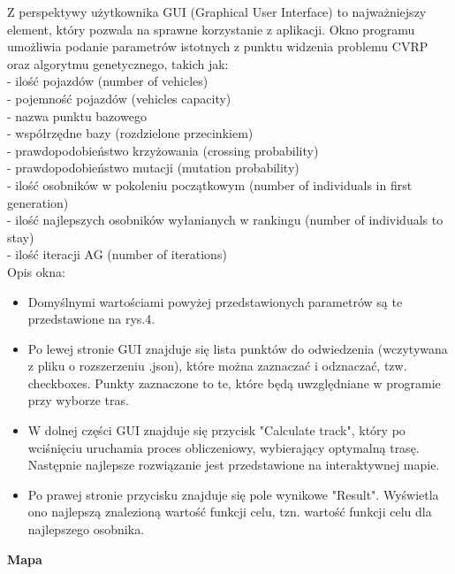 \documentclass[a4paper, twoside, 12pt, justified]{article}
\begin{document}
	Z perspektywy użytkownika GUI (Graphical User Interface) to najważniejszy element, który pozwala na sprawne korzystanie z aplikacji. Okno programu umożliwia podanie parametrów istotnych z punktu widzenia problemu CVRP oraz algorytmu genetycznego, takich jak: \\
	- ilość pojazdów (number of vehicles)\\
	- pojemność pojazdów (vehicles capacity)\\
	- nazwa punktu bazowego\\
	- współrzędne bazy (rozdzielone przecinkiem)\\
	- prawdopodobieństwo krzyżowania (crossing probability)\\
	- prawdopodobieństwo mutacji (mutation probability)\\
	- ilość osobników w pokoleniu początkowym (number of individuals in first generation)\\
	- ilość najlepszych osobników wyłanianych w rankingu (number of individuals to stay)\\
	- ilość iteracji AG (number of iterations)\\
	
	Opis okna:
	
	\begin{itemize}
		\item Domyślnymi wartościami powyżej przedstawionych parametrów są te przedstawione na rys.4.
		\item Po lewej stronie GUI znajduje się lista punktów do odwiedzenia (wczytywana z pliku o rozszerzeniu .json), które można zaznaczać i odznaczać, tzw. checkboxes. Punkty zaznaczone to te, które będą uwzględniane w programie przy wyborze tras.
		\item W dolnej części GUI znajduje się przycisk "Calculate track", który po wciśnięciu uruchamia proces obliczeniowy, wybierający optymalną trasę. Następnie najlepsze rozwiązanie jest przedstawione na interaktywnej mapie.
		\item Po prawej stronie przycisku znajduje się pole wynikowe "Result". Wyświetla ono najlepszą znalezioną wartość funkcji celu, tzn. wartość funkcji celu dla najlepszego osobnika.
	\end{itemize}

	\begin{large}
		\begin{center}
			\textbf{Mapa}
		\end{center}
	\end{large}
	
\end{document}
